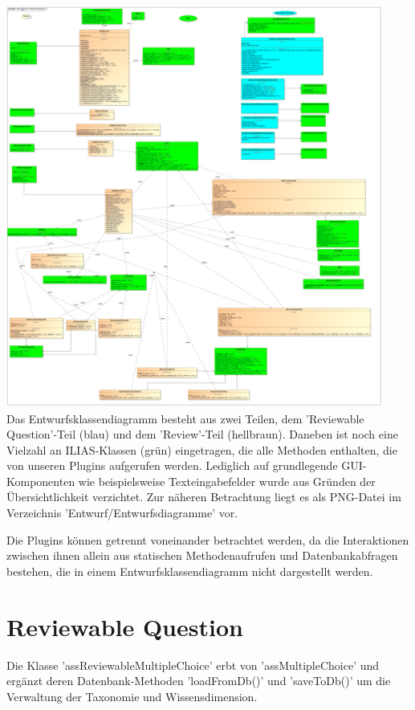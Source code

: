 \documentclass[a4paper]{scrreprt}
\begin{document}
\includegraphics[width=0.93\textwidth]{Class_Diagram__Entwurfsklassendiagramm.png}
\label{Entwurfsklassendiagramm}\\

Das Entwurfsklassendiagramm besteht aus zwei Teilen, dem 'Reviewable Question'-Teil (blau) und dem 'Review'-Teil (hellbraun). 
Daneben ist noch eine Vielzahl an ILIAS-Klassen (grün) eingetragen, die alle Methoden enthalten, die von unseren Plugins aufgerufen werden. 
Lediglich auf grundlegende GUI-Komponenten wie beispielsweise Texteingabefelder wurde aus Gründen der Übersichtlichkeit verzichtet. Zur näheren Betrachtung liegt es als PNG-Datei im Verzeichnis 'Entwurf/Entwurfsdiagramme' vor.

Die Plugins können getrennt voneinander betrachtet werden, da die Interaktionen zwischen ihnen allein aus statischen Methodenaufrufen und Datenbankabfragen bestehen, die in einem Entwurfsklassendiagramm nicht dargestellt werden.\\

\section{Reviewable Question}

Die Klasse 'assReviewableMultipleChoice' erbt von 'assMultipleChoice' und ergänzt deren Datenbank-Methoden 'loadFromDb()' und 'saveToDb()' um die Verwaltung der Taxonomie und Wissensdimension.\\
\end{document}
